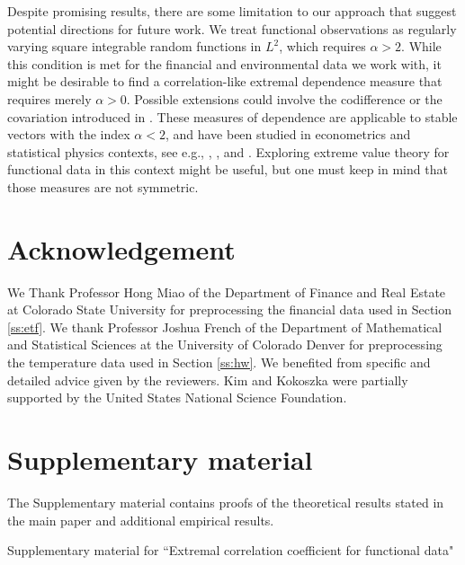 \documentclass[lineno]{biometrika}
\newcommand \ag{\alpha}
\begin{document}
Despite  promising results, there are some limitation to our approach that suggest potential directions for future work. We treat functional
observations as regularly varying square integrable
random functions in  $L^2$, which requires  $\ag>2$. While this condition is met for  the financial and environmental data we work with, it might be  desirable to find a correlation-like extremal dependence measure that requires merely $\ag>0$.
Possible extensions could involve the codifference or  the covariation introduced in \citet{kokoszka:taqqu:1995}. These measures of dependence are applicable to stable vectors with the index $\ag< 2$, and have been
studied in econometrics and statistical
physics contexts, see e.g., \citet{kokoszka:taqqu:1996}, \citet{levy:taqqu:2014}, and \citet{wolymanska:2015}. Exploring extreme value theory for functional data in this context might
be useful, but one must keep in mind that those measures are not symmetric.





\section*{Acknowledgement}
We Thank Professor Hong Miao of the Department of Finance and Real
Estate at Colorado State University for preprocessing the financial data used in Section \ref{ss:etf}. We thank Professor Joshua French of
the Department of Mathematical and Statistical Sciences at the University of Colorado Denver
for preprocessing the temperature data used in Section \ref{ss:hw}. We benefited from specific and detailed advice given by the reviewers. Kim and Kokoszka were partially supported by the United States National Science Foundation.


\section*{Supplementary material}
\label{SM}
The Supplementary material contains proofs of the theoretical results stated in the main
paper and additional empirical results.







\newpage

 \setcounter{page}{1}


\centerline{ \Large Supplementary material for ``Extremal correlation coefficient for functional data"}
\end{document}
